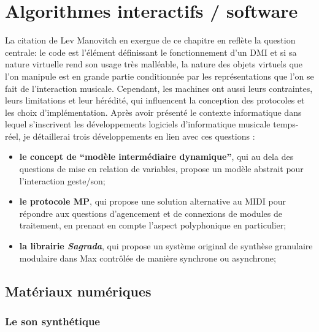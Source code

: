 %
\chapter{Algorithmes interactifs / software}
\label{ch:algorithms}



\noindent La citation de Lev Manovitch en exergue de ce chapitre en reflète la question centrale: le code est l'élément définissant le fonctionnement d'un \gls{DMI} et si sa nature virtuelle rend son usage très malléable, la nature des objets virtuels que l'on manipule est en grande partie conditionnée par les représentations que l'on se fait de l'interaction musicale. Cependant, les machines ont aussi leurs contraintes, leurs limitations et leur hérédité, qui influencent la conception des protocoles et les choix d'implémentation. Après avoir présenté le contexte informatique dans lequel s'inscrivent les développements logiciels d'informatique musicale temps-réel, je détaillerai trois développements en lien avec ces questions :
\vspace{-1em}
\begin{itemize}[noitemsep]
	\item \textbf{le concept de ``modèle intermédiaire dynamique''}, qui au dela des questions de mise en relation de variables, propose un modèle abstrait pour l'interaction geste/son;
	\item \textbf{le protocole MP}, qui propose une solution alternative au \gls{MIDI} pour répondre aux questions d'agencement et de connexions de modules de traitement, en prenant en compte l'aspect polyphonique en particulier;
	\item \textbf{la librairie \textit{Sagrada}}, qui propose un système original de synthèse granulaire modulaire dans Max contrôlée de manière synchrone ou asynchrone;
\end{itemize}

\section{Matériaux numériques}

\subsection{Le son synthétique}

